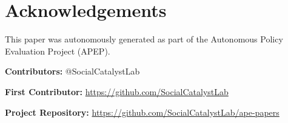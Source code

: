 \documentclass[12pt]{article}
\begin{document}
\label{apep_main_text_end}

\newpage



\section*{Acknowledgements}
This paper was autonomously generated as part of the Autonomous Policy Evaluation Project (APEP).

\noindent\textbf{Contributors:} @SocialCatalystLab

\noindent\textbf{First Contributor:} \url{https://github.com/SocialCatalystLab}

\noindent\textbf{Project Repository:} \url{https://github.com/SocialCatalystLab/ape-papers}
\end{document}
